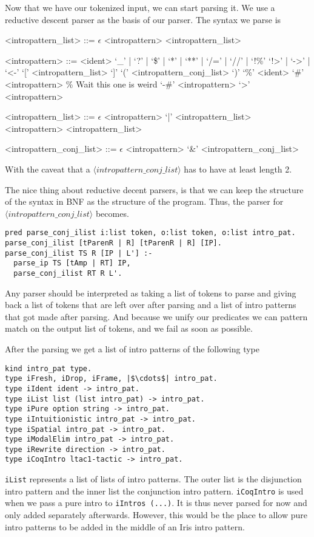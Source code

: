 \documentclass[thesis.tex]{subfiles}
\begin{document}
Now that we have our tokenized input, we can start parsing it. We use a reductive descent parser as the basis of our parser. The syntax we parse is
\begin{grammar}
  <intropattern\_list> ::= $\epsilon$
  \alt <intropattern> <intropattern\_list>

  <intropattern> ::= <ident>
  \alt `_' | `?' | `\$' | `*' | `**' | `/=' | `//' | `!\%'
  \alt `!>' | `->' | `<-'
  \alt `[' <intropattern\_list> `]'
  \alt `(' <intropattern\_conj\_list> `)'
  \alt `\%' <ident>
  \alt `#' <intropattern> \% Wait this one is weird
  \alt `-#' <intropattern>
  \alt `>' <intropattern>

  <intropattern\_list> ::= $\epsilon$
  \alt <intropattern> `|' <intropattern\_list>
  \alt <intropattern> <intropattern\_list>

  <intropattern\_conj\_list> ::= $\epsilon$
  \alt <intropattern> `&' <intropattern\_conj\_list>
\end{grammar}
With the caveat that a $\langle intropattern\_conj\_list\rangle$ has to have at least length 2.

The nice thing about reductive decent parsers, is that we can keep the structure of the syntax in BNF as the structure of the program. Thus, the parser for $\langle intropattern\_conj\_list\rangle$ becomes.
\begin{verbatim}
pred parse_conj_ilist i:list token, o:list token, o:list intro_pat.
parse_conj_ilist [tParenR | R] [tParenR | R] [IP].
parse_conj_ilist TS R [IP | L'] :-
  parse_ip TS [tAmp | RT] IP,
  parse_conj_ilist RT R L'.
\end{verbatim}
Any parser should be interpreted as taking a list of tokens to parse and giving back a list of tokens that are left over after parsing and a list of intro patterns that got made after parsing. And because we unify our predicates we can pattern match on the output list of tokens, and we fail as soon as possible.

After the parsing we get a list of intro patterns of the following type
\begin{verbatim}
kind intro_pat type.
type iFresh, iDrop, iFrame, |$\cdots$| intro_pat.
type iIdent ident -> intro_pat.
type iList list (list intro_pat) -> intro_pat.
type iPure option string -> intro_pat.
type iIntuitionistic intro_pat -> intro_pat.
type iSpatial intro_pat -> intro_pat.
type iModalElim intro_pat -> intro_pat.
type iRewrite direction -> intro_pat.
type iCoqIntro ltac1-tactic -> intro_pat.
\end{verbatim}
\texttt{iList} represents a list of lists of intro patterns. The outer list is the disjunction intro pattern and the inner list the conjunction intro pattern. \texttt{iCoqIntro} is used when we pass a pure intro to \texttt{iIntros (...)}. It is thus never parsed for now and only added separately afterwards. However, this would be the place to allow pure intro patterns to be added in the middle of an Iris intro pattern.
\end{document}
